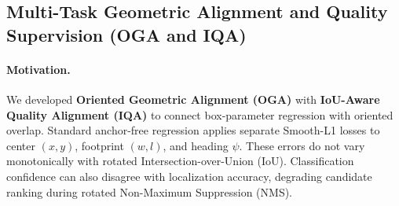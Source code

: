 \subsection{Multi-Task Geometric Alignment and Quality Supervision (OGA and IQA)}
\label{sec:losses_and_oga}

\paragraph{Motivation.}
We developed \textbf{Oriented Geometric Alignment (OGA)} with \textbf{IoU-Aware Quality Alignment (IQA)} to connect box-parameter regression with oriented overlap. Standard anchor-free regression applies separate Smooth-L1 losses to center $(x, y)$, footprint $(w, l)$, and heading $\psi$. These errors do not vary monotonically with rotated Intersection-over-Union (IoU). Classification confidence can also disagree with localization accuracy, degrading candidate ranking during rotated Non-Maximum Suppression (NMS).

